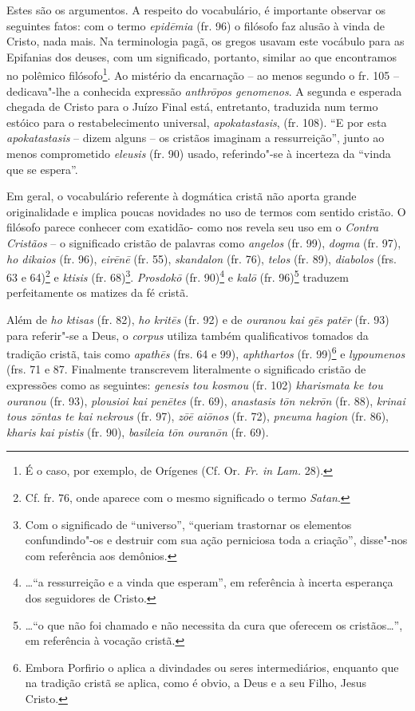 Estes são os argumentos. A respeito do vocabulário, é importante
observar os seguintes fatos: com o termo \textit{epidēmia}
(fr. 96) o filósofo faz alusão à vinda de Cristo, nada mais. Na
terminologia pagã, os gregos usavam este vocábulo para as Epifanias dos
deuses, com um significado, portanto, similar ao que encontramos no
polêmico filósofo\footnote{ É o caso, por exemplo, de Orígenes (Cf. Or.
\textit{Fr. in Lam.} 28).}. Ao mistério da encarnação – ao
menos segundo o fr. 105 – dedicava"-lhe a conhecida expressão
\textit{anthrōpos genomenos}.
A segunda e esperada chegada de Cristo para o Juízo Final está,
entretanto, traduzida num termo estóico para o
restabelecimento universal,
\textit{apokatastasis},
(fr. 108). ``E
por esta \textit{apokatastasis} – dizem alguns – os cristãos imaginam a
ressurreição”, junto ao menos comprometido
\textit{eleusis} (fr. 90) usado,
referindo"-se à incerteza da “vinda que se espera”.

Em geral, o vocabulário referente à dogmática cristã não aporta grande
originalidade e implica poucas novidades no uso de termos com sentido
cristão. O filósofo parece conhecer com exatidão- como nos revela seu
uso em o \textit{Contra Cristãos} – o significado cristão de palavras
como
\textit{angelos} (fr.
99), \textit{dogma} (fr. 97),
\textit{ho dikaios} (fr.
96),
\textit{eirēnē} (fr.
55),
\textit{skandalon} (fr.
76), \textit{telos} (fr. 89),
\textit{diabolos} (frs.
63 e 64)\footnote{ Cf. fr. 76, onde aparece com o mesmo significado o
termo \textit{Satan}.} e \textit{ktisis} (fr.
68)\footnote{ Com o significado de “universo”, “queriam trastornar os
elementos confundindo"-os e destruir com sua ação perniciosa toda a
criação”, disse"-nos com referência aos demônios.}.
\textit{Prosdokō} (fr.
90)\footnote{…“a ressurreição e a vinda que esperam”, em referência à incerta
esperança dos seguidores de Cristo.} e \textit{kalō}
(fr. 96)\footnote{ …“o
que não foi chamado e não necessita da cura que oferecem os cristãos…”,
em referência à vocação cristã.} traduzem perfeitamente os
matizes da fé cristã.

Além de
\textit{ho ktisas} (fr.
82), \textit{ho kritēs} (fr.
92) e de \textit{ouranou kai gēs patēr} (fr.
93) para referir"-se a Deus, o \textit{corpus} utiliza também
qualificativos tomados da tradição cristã, tais como
\textit{apathēs} (frs.
64 e
99), \textit{aphthartos} (fr.
99)\footnote{ Embora Porfirio o aplica a divindades ou seres
intermediários, enquanto que na tradição cristã se aplica, como é
obvio, a Deus e a seu Filho, Jesus Cristo.} e
\textit{lypoumenos} (frs.
71 e 87. Finalmente transcrevem literalmente o significado
cristão de expressões como as seguintes:
\textit{genesis tou kosmou}
(fr. 102)
\textit{kharismata ke tou ouranou}
(fr. 93), \textit{plousioi kai penētes} (fr.
69), \textit{anastasis tōn nekrōn} (fr.
88), \textit{krinai tous zōntas te kai nekrous} (fr.
97), \textit{zōē aiōnos} (fr.
72), \textit{pneuma hagion} (fr.
86), \textit{kharis kai pistis} (fr.
90), \textit{basileia tōn ouranōn} (fr.
69).

